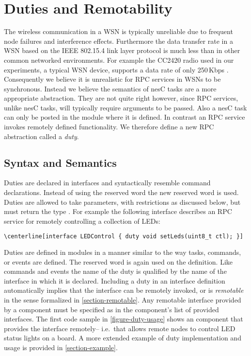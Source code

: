 \section{Duties and Remotability}
\label{section-duties}

The wireless communication in a WSN is typically unreliable due to
frequent node failures and interference effects. Furthermore the data
transfer rate in a WSN based on the IEEE 802.15.4 link layer protocol
is much less than in other common networked environments. For example
the CC2420 radio used in our experiments, a typical WSN device,
supports a data rate of only 250\,Kbps
\cite{cc2420-datasheet}. Consequently we believe it is unrealistic for
RPC services in WSNs to be synchronous. Instead we believe the
semantics of nesC tasks are a more appropriate abstraction. They are
not quite right however, since RPC services, unlike nesC tasks, will
typically require arguments to be passed. Also a nesC task can only be
posted in the module where it is defined. In contrast an RPC service
invokes remotely defined functionality. We therefore define a new RPC
abstraction called a \emph{duty}.

\subsection{Syntax and Semantics}
\label{section-duties-syntax}

Duties are declared in interfaces and syntactically resemble command
declarations. Instead of using the reserved word  the new
reserved word  is used. Duties are allowed to take
parameters, with restrictions as discussed below, but must return the
type . For example the following interface describes an RPC
service for remotely controlling a collection of LEDs:

\begin{Verbatim}[fontsize=\small, commandchars=\\\[\]]
\centerline[interface LEDControl { duty void setLeds(uint8_t ctl); }]
\end{Verbatim}

Duties are defined in modules in a manner similar to the way tasks,
commands, or events are defined. The reserved word  is again
used on the definition. Like commands and events the name of the duty is
qualified by the name of the interface in which it is declared.
Including a duty in an interface definition automatically implies that
the interface can be remotely invoked, or is \emph{remotable} in the
sense formalized in \autoref{section-remotable}. Any remotable interface
provided by a component must be specified as  in the
component's list of provided interfaces. The first code sample in
\autoref{figure-duty-usage} shows an  component
that provides the  interface remotely-- i.e.~that
allows remote nodes to control LED status lights on a board. A more
extended example of duty implementation and usage is provided in
\autoref{section-example}.

